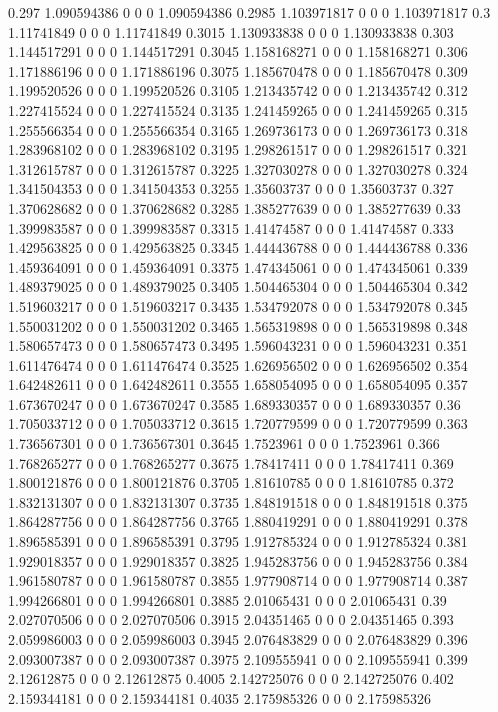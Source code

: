 {0.297 1.090594386 0 0 0 1.090594386
0.2985 1.103971817 0 0 0 1.103971817
0.3 1.11741849 0 0 0 1.11741849
0.3015 1.130933838 0 0 0 1.130933838
0.303 1.144517291 0 0 0 1.144517291
0.3045 1.158168271 0 0 0 1.158168271
0.306 1.171886196 0 0 0 1.171886196
0.3075 1.185670478 0 0 0 1.185670478
0.309 1.199520526 0 0 0 1.199520526
0.3105 1.213435742 0 0 0 1.213435742
0.312 1.227415524 0 0 0 1.227415524
0.3135 1.241459265 0 0 0 1.241459265
0.315 1.255566354 0 0 0 1.255566354
0.3165 1.269736173 0 0 0 1.269736173
0.318 1.283968102 0 0 0 1.283968102
0.3195 1.298261517 0 0 0 1.298261517
0.321 1.312615787 0 0 0 1.312615787
0.3225 1.327030278 0 0 0 1.327030278
0.324 1.341504353 0 0 0 1.341504353
0.3255 1.35603737 0 0 0 1.35603737
0.327 1.370628682 0 0 0 1.370628682
0.3285 1.385277639 0 0 0 1.385277639
0.33 1.399983587 0 0 0 1.399983587
0.3315 1.41474587 0 0 0 1.41474587
0.333 1.429563825 0 0 0 1.429563825
0.3345 1.444436788 0 0 0 1.444436788
0.336 1.459364091 0 0 0 1.459364091
0.3375 1.474345061 0 0 0 1.474345061
0.339 1.489379025 0 0 0 1.489379025
0.3405 1.504465304 0 0 0 1.504465304
0.342 1.519603217 0 0 0 1.519603217
0.3435 1.534792078 0 0 0 1.534792078
0.345 1.550031202 0 0 0 1.550031202
0.3465 1.565319898 0 0 0 1.565319898
0.348 1.580657473 0 0 0 1.580657473
0.3495 1.596043231 0 0 0 1.596043231
0.351 1.611476474 0 0 0 1.611476474
0.3525 1.626956502 0 0 0 1.626956502
0.354 1.642482611 0 0 0 1.642482611
0.3555 1.658054095 0 0 0 1.658054095
0.357 1.673670247 0 0 0 1.673670247
0.3585 1.689330357 0 0 0 1.689330357
0.36 1.705033712 0 0 0 1.705033712
0.3615 1.720779599 0 0 0 1.720779599
0.363 1.736567301 0 0 0 1.736567301
0.3645 1.7523961 0 0 0 1.7523961
0.366 1.768265277 0 0 0 1.768265277
0.3675 1.78417411 0 0 0 1.78417411
0.369 1.800121876 0 0 0 1.800121876
0.3705 1.81610785 0 0 0 1.81610785
0.372 1.832131307 0 0 0 1.832131307
0.3735 1.848191518 0 0 0 1.848191518
0.375 1.864287756 0 0 0 1.864287756
0.3765 1.880419291 0 0 0 1.880419291
0.378 1.896585391 0 0 0 1.896585391
0.3795 1.912785324 0 0 0 1.912785324
0.381 1.929018357 0 0 0 1.929018357
0.3825 1.945283756 0 0 0 1.945283756
0.384 1.961580787 0 0 0 1.961580787
0.3855 1.977908714 0 0 0 1.977908714
0.387 1.994266801 0 0 0 1.994266801
0.3885 2.01065431 0 0 0 2.01065431
0.39 2.027070506 0 0 0 2.027070506
0.3915 2.04351465 0 0 0 2.04351465
0.393 2.059986003 0 0 0 2.059986003
0.3945 2.076483829 0 0 0 2.076483829
0.396 2.093007387 0 0 0 2.093007387
0.3975 2.109555941 0 0 0 2.109555941
0.399 2.12612875 0 0 0 2.12612875
0.4005 2.142725076 0 0 0 2.142725076
0.402 2.159344181 0 0 0 2.159344181
0.4035 2.175985326 0 0 0 2.175985326
}
